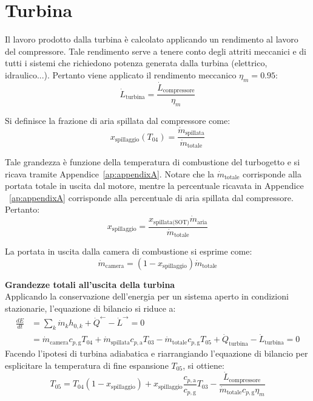 \section{Turbina}
\label{appB:turbina}

Il lavoro prodotto dalla turbina è calcolato applicando un rendimento al lavoro del compressore. Tale rendimento serve a tenere conto degli attriti meccanici e di tutti i sistemi che richiedono potenza generata dalla turbina (elettrico, idraulico...). Pertanto viene applicato il rendimento meccanico $\eta_m = 0.95$:
\begin{equation*}
   \dot{L}_{\text{turbina}} = \frac{\dot{L}_{\text{compressore}}}{\eta_m}
\end{equation*}

Si definisce la frazione di aria spillata dal compressore come:
\begin{equation*}
    x_{\text{spillaggio}}(T_{\text{04}}) = \frac{\dot{m}_{\text{spillata}}}{\dot{m}_{\text{totale}}} 
\end{equation*}

Tale grandezza è funzione della temperatura di combustione del turbogetto e si ricava tramite Appendice~\ref{ap:appendixA}. Notare che la $\dot{m}_\text{totale}$ corrisponde alla portata totale in uscita dal motore, mentre la percentuale ricavata in Appendice ~\ref{ap:appendixA} corrisponde alla percentuale di aria spillata dal compressore. Pertanto:
\begin{equation*}
    x_\text{spillaggio} = \frac{x_\text{spillata(SOT)}\dot{m}_\text{aria}}{\dot{m}_\text{totale}}
\end{equation*}



La portata in uscita dalla camera di combustione si esprime come:
\begin{equation*}
    \dot{m}_{\text{camera}} = (1 - x_{\text{spillaggio}}) \dot{m}_{\text{totale}} 
\end{equation*}

\textbf{Grandezze totali all'uscita della turbina}\\
Applicando la conservazione dell'energia per un sistema aperto in condizioni
stazionarie, l'equazione di bilancio si riduce a:
\begin{align*}
    \frac{dE}{dt} &= \sum_{k}\dot{m}_k h_{0,k} + \dot{Q}^{\leftarrow} - \dot{L}^{\rightarrow} = 0 \\
    &= \dot{m}_{\text{camera}} c_{p,\text{g}} T_{04} + \dot{m}_{\text{spillata}} c_{p,\text{a}} T_{03} - \dot{m}_{\text{totale}} c_{p,\text{g}} T_{05} +\dot{Q}_{\text{turbina}}- \dot{L}_{\text{turbina}}  = 0
\end{align*}
Facendo l'ipotesi di turbina adiabatica e riarrangiando l'equazione di bilancio per esplicitare la temperatura di fine espansione $T_{05}$, si ottiene:
\begin{equation*}
    T_{05} = T_{04} (1 - x_{\text{spillaggio}}) + x_{\text{spillaggio}} \frac{c_{p,\text{a}}}{c_{p,\text{g}}} T_{03} - \frac{\dot{L}_{\text{compressore}}}{\dot{m}_{\text{totale}} c_{p,\text{g}} \eta_m}
\end{equation*}

